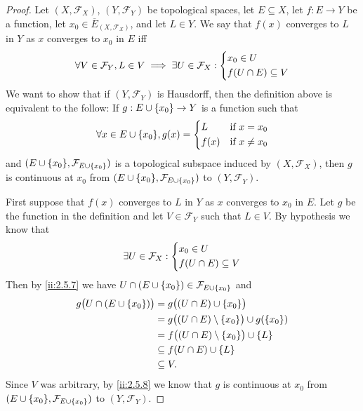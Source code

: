 \begin{proof}
  Let \((X, \mathcal{F}_X)\), \((Y, \mathcal{F}_Y)\) be topological spaces, let \(E \subseteq X\), let \(f : E \to Y\) be a function, let \(x_0 \in \overline{E}_{(X, \mathcal{F}_X)}\), and let \(L \in Y\).
  We say that \(f(x)\) converges to \(L\) in \(Y\) as \(x\) converges to \(x_0\) in \(E\) iff
  \[
    \forall V \in \mathcal{F}_Y, L \in V \implies \exists U \in \mathcal{F}_X : \begin{dcases}
      x_0 \in U \\
      f(U \cap E) \subseteq V
    \end{dcases}
  \]
  We want to show that if \((Y, \mathcal{F}_Y)\) is Hausdorff, then the definition above is equivalent to the follow:
  If \(g : E \cup \left\lbrace x_0\right\rbrace \to Y\) is a function such that
  \[
    \forall x \in E \cup \set{x_0}, g(x) = \begin{dcases}
      L    & \text{if } x = x_0    \\
      f(x) & \text{if } x \neq x_0
    \end{dcases}
  \]
  and \((E \cup \set{x_0}, \mathcal{F}_{E \cup \set{x_0}})\) is a topological subspace induced by \((X, \mathcal{F}_X)\), then \(g\) is continuous at \(x_0\) from \((E \cup \set{x_0}, \mathcal{F}_{E \cup \set{x_0}})\) to \((Y, \mathcal{F}_Y)\).

  First suppose that \(f(x)\) converges to \(L\) in \(Y\) as \(x\) converges to \(x_0\) in \(E\).
  Let \(g\) be the function in the definition and let \(V \in \mathcal{F}_Y\) such that \(L \in V\).
  By hypothesis we know that
  \[
    \exists U \in \mathcal{F}_X : \begin{dcases}
      x_0 \in U \\
      f(U \cap E) \subseteq V
    \end{dcases}
  \]
  Then by \cref{ii:2.5.7} we have \(U \cap (E \cup \left\lbrace x_0\right\rbrace) \in \mathcal{F}_{E \cup \left\lbrace x_0\right\rbrace}\) and
  \begin{align*}
    g\big(U \cap (E \cup \set{x_0})\big) & = g\big((U \cap E) \cup \set{x_0}\big)                        \\
                                         & = g\big((U \cap E) \setminus \set{x_0}\big) \cup g(\set{x_0}) \\
                                         & = f\big((U \cap E) \setminus \set{x_0}\big) \cup \set{L}      \\
                                         & \subseteq f(U \cap E) \cup \set{L}                            \\
                                         & \subseteq V.
  \end{align*}
  Since \(V\) was arbitrary, by \cref{ii:2.5.8} we know that \(g\) is continuous at \(x_0\) from \((E \cup \set{x_0}, \mathcal{F}_{E \cup \set{x_0}})\) to \((Y, \mathcal{F}_Y)\).


\end{proof}
